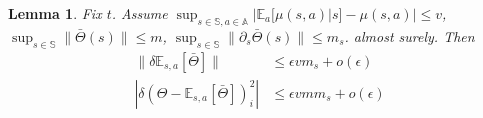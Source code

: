 \documentclass[10.5pt]{article}
\newcommand\bb{\mathbb}
\newtheorem{lemma}{Lemma}
\begin{document}
\begin{lemma}
  Fix $t$. Assume
  $\sup_{s\in \bb S,a\in \bb A}|\bb E_a[\mu(s,a)|s] - \mu(s,a)| \leq  v$,
  $\sup_{s\in \bb S}\| \bar \Theta(s)\| \leq  m$,
  $\sup_{s\in \bb S}\|\partial_s \bar \Theta(s)\| \leq m_s$.
  almost surely.
  Then
  \begin{align*}
    \|\delta \bb E_{s,a}[\bar \Theta]\| &\leq \epsilon v m_s + o(\epsilon)\\
    |\delta (\Theta - \bb E_{s,a}[\bar \Theta])_i^2| &\leq \epsilon v m m_s + o(\epsilon)
  \end{align*}






\end{lemma}
\end{document}
